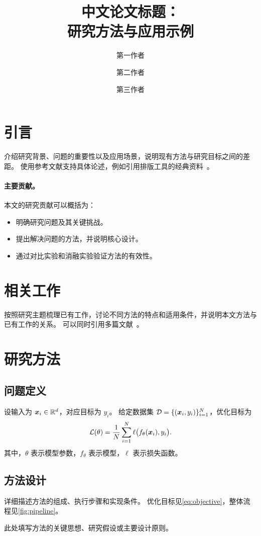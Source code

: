 \documentclass[twocolumn]{paper}
\title{中文论文标题：\\研究方法与应用示例}
\author[1]{第一作者}
\author[1]{第二作者}
\author[1\corrauthor]{第三作者}
\affiliation[1]{吉林大学某某学院，吉林长春，130012}
\begin{document}
\maketitle

\section{引言}
介绍研究背景、问题的重要性以及应用场景，说明现有方法与研究目标之间的差距。
使用参考文献支持具体论述，例如引用排版工具的经典资料~\citep{lamport1994latex}。

\paragraph{主要贡献。}
本文的研究贡献可以概括为：
\begin{itemize}
  \item 明确研究问题及其关键挑战。
  \item 提出解决问题的方法，并说明核心设计。
  \item 通过对比实验和消融实验验证方法的有效性。
\end{itemize}

\section{相关工作}
按照研究主题梳理已有工作，讨论不同方法的特点和适用条件，并说明本文方法与已有工作的关系。
可以同时引用多篇文献~\citep{lamport1994latex,knuth1984texbook}。

\section{研究方法}
\subsection{问题定义}
设输入为 $\bm{x}_i\in\mathbb{R}^d$，对应目标为 $y_i$。
给定数据集 $\mathcal{D}=\{(\bm{x}_i,y_i)\}_{i=1}^{N}$，优化目标为
\begin{equation}
  \mathcal{L}(\theta)=\frac{1}{N}\sum_{i=1}^{N}
  \ell\bigl(f_\theta(\bm{x}_i),y_i\bigr).
  \label{eq:objective}
\end{equation}
其中，$\theta$ 表示模型参数，$f_\theta$ 表示模型，$\ell$ 表示损失函数。

\subsection{方法设计}
详细描述方法的组成、执行步骤和实现条件。
优化目标见\cref{eq:objective}，整体流程见\cref{fig:pipeline}。
\begin{highlightbox}[核心思想]
此处填写方法的关键思想、研究假设或主要设计原则。
\end{highlightbox}
\end{document}
